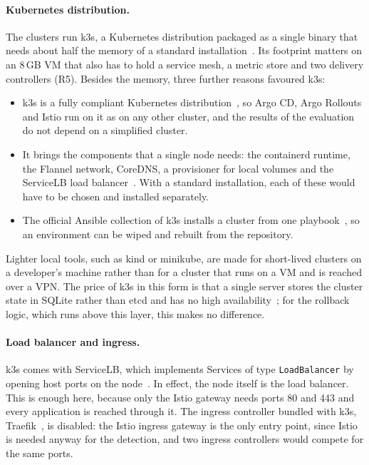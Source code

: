 \paragraph{Kubernetes distribution.} The clusters run k3s, a Kubernetes distribution packaged as a single binary that needs about half the memory of a standard installation~\cite{K3s}. Its footprint matters on an 8\,GB VM that also has to hold a service mesh, a metric store and two delivery controllers (R5). Besides the memory, three further reasons favoured k3s:
\begin{itemize}
	\item k3s is a fully compliant Kubernetes distribution~\cite{K3s}, so Argo CD, Argo Rollouts and Istio run on it as on any other cluster, and the results of the evaluation do not depend on a simplified cluster.
	\item It brings the components that a single node needs: the containerd runtime, the Flannel network, CoreDNS, a provisioner for local volumes and the ServiceLB load balancer~\cite{K3s}. With a standard installation, each of these would have to be chosen and installed separately.
	\item The official Ansible collection of k3s installs a cluster from one playbook~\cite{K3sAnsible}, so an environment can be wiped and rebuilt from the repository.
\end{itemize}
Lighter local tools, such as kind or minikube, are made for short-lived clusters on a developer's machine rather than for a cluster that runs on a VM and is reached over a VPN. The price of k3s in this form is that a single server stores the cluster state in SQLite rather than etcd and has no high availability~\cite{K3s}; for the rollback logic, which runs above this layer, this makes no difference.

\paragraph{Load balancer and ingress.} k3s comes with ServiceLB, which implements Services of type \texttt{LoadBalancer} by opening host ports on the node~\cite{K3sServiceLB}. In effect, the node itself is the load balancer. This is enough here, because only the Istio gateway needs ports 80 and 443 and every application is reached through it. The ingress controller bundled with k3s, Traefik~\cite{Traefik}, is disabled: the Istio ingress gateway is the only entry point, since Istio is needed anyway for the detection, and two ingress controllers would compete for the same ports.

